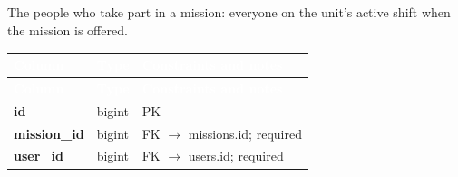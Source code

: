 \subsection*{}
The people who take part in a mission: everyone on the unit’s active shift when the mission is offered.\par\vspace{2pt}
{\tabfont\rowband
\begin{longtable}{@{}>{\raggedright\arraybackslash}p{}>{\raggedright\arraybackslash}p{}>{\raggedright\arraybackslash}p{}@{}}
\rowcolor{najdanavy}\textcolor{white}{\sffamily\bfseries\small Column} & \textcolor{white}{\sffamily\bfseries\small Type} & \textcolor{white}{\sffamily\bfseries\small Constraints and notes}\\
\endfirsthead
\rowcolor{najdanavy}\textcolor{white}{\sffamily\bfseries\small Column} & \textcolor{white}{\sffamily\bfseries\small Type} & \textcolor{white}{\sffamily\bfseries\small Constraints and notes}\\
\endhead
\bottomrule\endlastfoot
\textbf{id} & bigint & PK\\
\textbf{mission\_\allowbreak{}id} & bigint & FK $\rightarrow$ missions.id; required\\
\textbf{user\_\allowbreak{}id} & bigint & FK $\rightarrow$ users.id; required\\
\end{longtable}}

